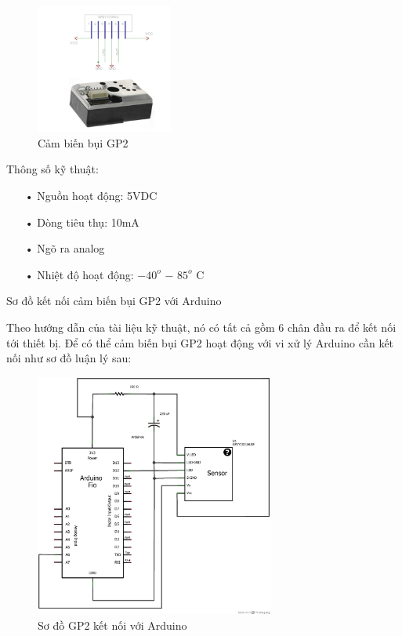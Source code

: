 \begin{center}
\begin{figure}[htp]
\centering  
\includegraphics[width=0.4\textwidth]{gp2}
\caption[Cảm biến bụi GP2 ]{Cảm biến bụi GP2}
\label{fig:gp2}
\end{figure}
\end{center}


Thông số kỹ thuật:
\begin{itemize}
\item[•]Nguồn hoạt động: 5VDC
\item[•]Dòng tiêu thụ: 10mA
\item[•]Ngõ ra analog
\item[•]Nhiệt độ hoạt động: $-40^{o}$ $-$ $85 ^{o}$ C
\end{itemize}

Sơ đồ kết nối cảm biến bụi GP2 với Arduino

Theo hướng dẫn của tài liệu kỹ thuật, nó có tất cả gồm 6 chân đầu ra để kết nối tới thiết bị. Để có thể cảm biến bụi GP2 hoạt động với vi xử lý Arduino cần kết nối như sơ đồ luận lý sau:
\begin{center}
\begin{figure}[htp]
\centering    
\includegraphics[width=0.7\textwidth]{sodogp2}
\caption[Sơ đồ GP2 kết nối với Arduino ]{Sơ đồ GP2 kết nối với Arduino}
\label{fig:sodogp2}
\end{figure}
\end{center}






